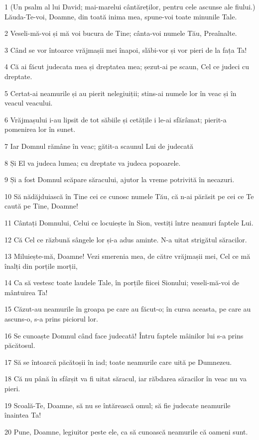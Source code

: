 \par 1 (Un psalm al lui David; mai-marelui cântăreților, pentru cele ascunse ale fiului.) Lăuda-Te-voi, Doamne, din toată inima mea, spune-voi toate minunile Tale.
\par 2 Veseli-mă-voi și mă voi bucura de Tine; cânta-voi numele Tău, Preaînalte.
\par 3 Când se vor întoarce vrăjmașii mei înapoi, slăbi-vor și vor pieri de la fața Ta!
\par 4 Că ai făcut judecata mea și dreptatea mea; șezut-ai pe scaun, Cel ce judeci cu dreptate.
\par 5 Certat-ai neamurile și au pierit nelegiuiții; stins-ai numele lor în veac și în veacul veacului.
\par 6 Vrăjmașului i-au lipsit de tot săbiile și cetățile i le-ai sfărâmat; pierit-a pomenirea lor în sunet.
\par 7 Iar Domnul rămâne în veac; gătit-a scaunul Lui de judecată
\par 8 Și El va judeca lumea; cu dreptate va judeca popoarele.
\par 9 Și a fost Domnul scăpare săracului, ajutor la vreme potrivită în necazuri.
\par 10 Să nădăjduiască în Tine cei ce cunosc numele Tău, că n-ai părăsit pe cei ce Te caută pe Tine, Doamne!
\par 11 Cântați Domnului, Celui ce locuiește în Sion, vestiți între neamuri faptele Lui.
\par 12 Că Cel ce răzbună sângele lor și-a adus aminte. N-a uitat strigătul săracilor.
\par 13 Miluiește-mă, Doamne! Vezi smerenia mea, de către vrăjmașii mei, Cel ce mă înalți din porțile morții,
\par 14 Ca să vestesc toate laudele Tale, în porțile fiicei Sionului; veseli-mă-voi de mântuirea Ta!
\par 15 Căzut-au neamurile în groapa pe care au făcut-o; în cursa aceasta, pe care au ascuns-o, s-a prins piciorul lor.
\par 16 Se cunoaște Domnul când face judecată! Întru faptele mâinilor lui s-a prins păcătosul.
\par 17 Să se întoarcă păcătoșii în iad; toate neamurile care uită pe Dumnezeu.
\par 18 Că nu până în sfârșit va fi uitat săracul, iar răbdarea săracilor în veac nu va pieri.
\par 19 Scoală-Te, Doamne, să nu se întărească omul; să fie judecate neamurile înaintea Ta!
\par 20 Pune, Doamne, legiuitor peste ele, ca să cunoască neamurile că oameni sunt.

